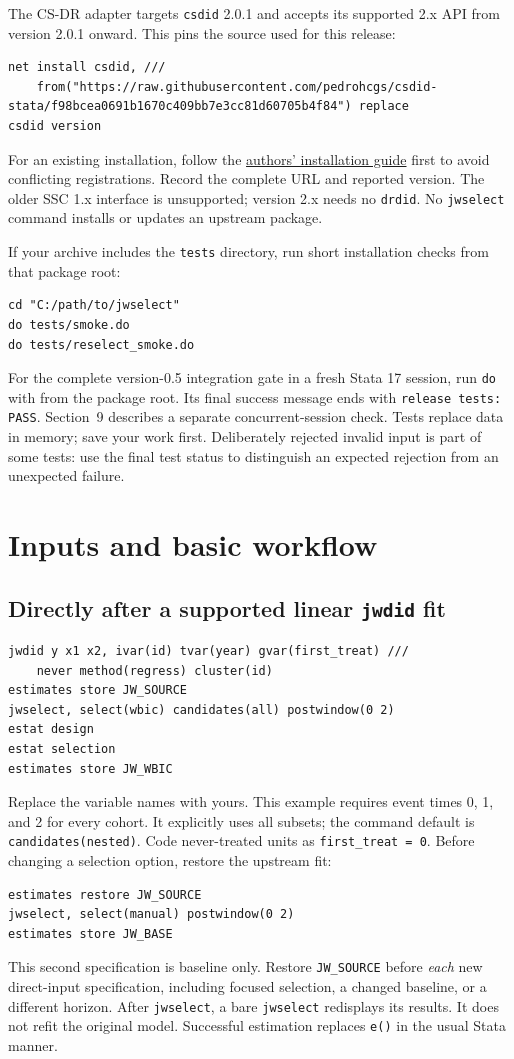 \documentclass[11pt]{article}
\newcommand{\cmd}[1]{\texttt{#1}}
\begin{document}
The CS-DR adapter targets \cmd{csdid} 2.0.1 and accepts its supported 2.x API
from version 2.0.1 onward. This pins the source used for this release:
\begin{lstlisting}
net install csdid, ///
    from("https://raw.githubusercontent.com/pedrohcgs/csdid-stata/f98bcea0691b1670c409bb7e3cc81d60705b4f84") replace
csdid version
\end{lstlisting}
For an existing installation, follow the
\href{https://psantanna.com/csdid/}{authors' installation guide} first to avoid
conflicting registrations. Record the complete URL and reported version.
The older SSC 1.x interface is unsupported; version 2.x needs no \cmd{drdid}.
No \cmd{jwselect} command installs or updates an upstream package.


If your archive includes the \cmd{tests} directory, run short installation
checks from that package root:
\begin{lstlisting}
cd "C:/path/to/jwselect"
do tests/smoke.do
do tests/reselect_smoke.do
\end{lstlisting}
For the complete version-0.5 integration gate in a fresh Stata 17 session,
run \cmd{do} with  from the package root. Its final success
message ends with \cmd{release tests: PASS}. Section~9 describes a separate concurrent-session check. Tests replace data in memory; save your work first. Deliberately
rejected invalid input is part of some tests: use the final test status to
distinguish an expected rejection from an unexpected failure.

\section{Inputs and basic workflow}
\subsection{Directly after a supported linear \texttt{jwdid} fit}
\begin{lstlisting}
jwdid y x1 x2, ivar(id) tvar(year) gvar(first_treat) ///
    never method(regress) cluster(id)
estimates store JW_SOURCE
jwselect, select(wbic) candidates(all) postwindow(0 2)
estat design
estat selection
estimates store JW_WBIC
\end{lstlisting}
Replace the variable names with yours. This example requires event times
0, 1, and 2 for every cohort. It explicitly uses all subsets; the command
 default is \cmd{candidates(nested)}. Code never-treated units as
\cmd{first\_treat = 0}. Before changing a selection option,
restore the upstream fit:
\begin{lstlisting}
estimates restore JW_SOURCE
jwselect, select(manual) postwindow(0 2)
estimates store JW_BASE
\end{lstlisting}
This second specification is baseline only. Restore \cmd{JW\_SOURCE} before
\emph{each} new direct-input specification, including focused selection,
a changed baseline, or a different horizon.
After \cmd{jwselect}, a bare \cmd{jwselect} redisplays its results.
It does not refit the original model. Successful estimation replaces
\cmd{e()} in the usual Stata manner.
\end{document}

